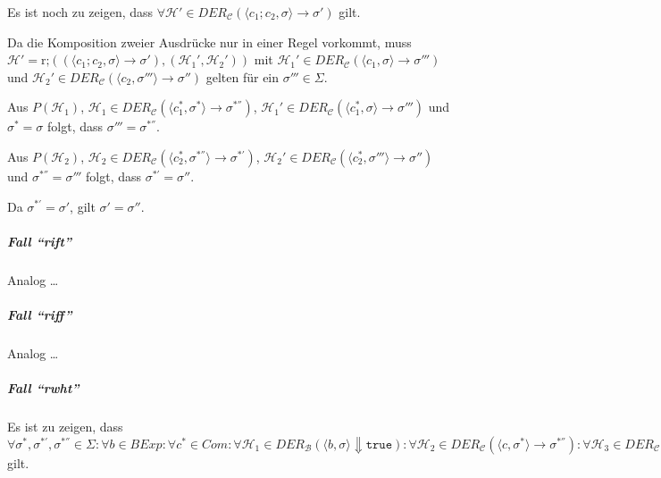 				    Es ist noch zu zeigen, dass $ \forall \mathcal{H}' \in \textit{DER} _ \mathcal{C} (\langle c _ 1 ; c _ 2, \sigma \rangle \rightarrow \sigma') $ gilt.
				    
				    Da die Komposition zweier Ausdrücke nur in einer Regel vorkommt, muss $ \mathcal{H}' = \text{r;}((\langle c _ 1 ; c _ 2, \sigma \rangle \rightarrow \sigma'), (\mathcal{H} _ 1 ', \mathcal{H} _ 2 ')) $ mit $ \mathcal{H} _ 1 ' \in \textit{DER} _ \mathcal{C} (\langle c _ 1, \sigma \rangle \rightarrow \sigma''') $ und $ \mathcal{H} _ 2 ' \in \textit{DER} _ \mathcal{C} (\langle c _ 2, \sigma''' \rangle \rightarrow \sigma'') $ gelten für ein $ \sigma''' \in \Sigma $.
				    
				    Aus $ P(\mathcal{H} _ 1) $, $ \mathcal{H} _ 1 \in \textit{DER} _ \mathcal{C} (\langle c _ 1 ^ *, \sigma ^ * \rangle \rightarrow \sigma ^ {*''}) $, $ \mathcal{H} _ 1 ' \in \textit{DER} _ \mathcal{C} (\langle c _ 1 ^ *, \sigma \rangle \rightarrow \sigma''') $ und $ \sigma ^ * = \sigma $ folgt, dass $ \sigma''' = \sigma ^ {*''} $.
				    
				    Aus $ P(\mathcal{H} _ 2) $, $ \mathcal{H} _ 2 \in \textit{DER} _ \mathcal{C} (\langle c _ 2 ^ *, \sigma ^ {*''} \rangle \rightarrow \sigma ^ {*'}) $, $ \mathcal{H} _ 2 ' \in \textit{DER} _ \mathcal{C} (\langle c _ 2 ^ *, \sigma''' \rangle \rightarrow \sigma'' ) $ und  $ \sigma ^ {*''} = \sigma''' $ folgt, dass $ \sigma ^ {*'} = \sigma'' $.
				    
				    Da $ \sigma ^ {*'} = \sigma' $, gilt $ \sigma' = \sigma'' $.
			    
			    \subparagraph{Fall \enquote{rift}}
				    Analog \dots
			    
			    \subparagraph{Fall \enquote{riff}}
				    Analog \dots
			    
			    \subparagraph{Fall \enquote{rwht}}
				    Es ist zu zeigen, dass $ \forall \sigma ^ *, \sigma ^ {*'}, \sigma ^ {*''} \in \Sigma : \forall b \in \textit{BExp} : \forall c ^ * \in \textit{Com} : \forall \mathcal{H} _ 1 \in \textit{DER} _ \mathcal{B} (\langle b, \sigma \rangle \Downarrow \texttt{true}) : \forall \mathcal{H} _ 2 \in \textit{DER} _ \mathcal{C} (\langle c, \sigma ^ * \rangle \rightarrow \sigma ^ {*''}) : \forall \mathcal{H} _ 3 \in \textit{DER} _ \mathcal{C} (\langle \texttt{while } b \texttt{ do } c \texttt{ od}, \sigma ^ {*''} \rangle \rightarrow \sigma ^ {*'}) : P(\mathcal{H} _ 2) \land P(\mathcal{H} _ 3) \implies P(\text{rwht})((\langle \texttt{while } b \texttt{ do } c \texttt{ od}, \sigma ^ * \rangle \rightarrow \sigma ^ {*'}), (\mathcal{H} _ 1, \mathcal{H} _ 2, \mathcal{H} _ 3)) $ gilt.
				    
